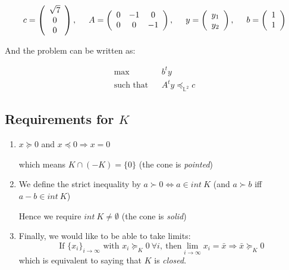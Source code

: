 \begin{example}
\begin{leftbar}
\begin{center}
\[
c =\left( \begin{array}{c}
\sqrt7 \\ 
0 \\
0 \end{array}
\right)
, 
\hspace{0.5cm}
A = \left( \begin{array}{ccc}
0 & -1 & 0 \\
0 & 0 & -1 \end{array} \right), 
\hspace{0.5cm}
y = \left( \begin{array}{c}
y_1 \\
y_2 \end{array} \right)
, 
\hspace{0.5cm}
b = \left( \begin{array}{c}
1 \\
1 \end{array} \right)
\]
\end{center}
And the problem can be written as: 
\begin{center}
\begin{eqnarray*}
\max & & b^t y \\
\text{such that} & & A^t y \preceq_{\mathbb{L}^2} c
\end{eqnarray*}
\end{center}
\end{leftbar}
\end{example}

\subsection{Requirements for $K$} 
\begin{enumerate}
\item $x \succeq 0$ and $x \preceq 0 \Rightarrow x = 0$

which means $K \cap (-K) = \{ 0 \}$ (the cone is \emph{pointed})

\item We define the strict inequality by $a \succ 0
\Leftrightarrow a \in int ~K$ (and $a \succ b$ iff $a-b \in int~
K$)

Hence we require $int~ K \neq \emptyset$ (the cone is
\emph{solid})

\item Finally, we would like to be able to take limits:
\[ \text{If } \{ x_i \}_{i \to \infty} \text{ with } x_i \succeq_K
0 \ \forall i,\ \text{then} \lim_{i \to \infty} x_i = \bar{x}
\Rightarrow \bar{x} \succeq_K 0 \] which is equivalent to saying
that $K$ is \emph{closed}. \end{enumerate} 


